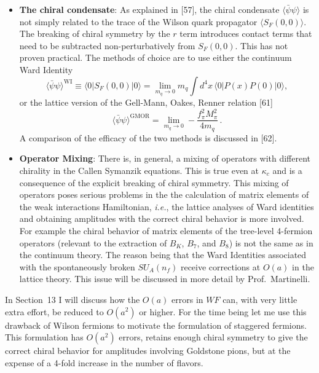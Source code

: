 \begin{itemize}
\item \textbf{The chiral condensate}: As explained in [57], the chiral
condensate $\langle \bar\psi \psi \rangle$ is not simply related to the trace
of the Wilson quark propagator $\langle S_F(0,0) \rangle$.  The breaking of
chiral symmetry by the $r$ term introduces contact terms that need to be
subtracted non-perturbatively from $S_F(0,0)$.  This has not proven practical.
The methods of choice are to use either the continuum Ward Identity
\begin{equation}
\langle \bar\psi\psi \rangle^{\mathrm{WI}} \equiv \langle 0| S_F(0,0) |0\rangle = \lim_{m_q \to 0} m_q \int d^4x\, \langle 0| P(x)P(0) |0\rangle,
\end{equation}
or the lattice version of the Gell-Mann, Oakes, Renner relation [61]
\begin{equation}
\langle \bar\psi\psi \rangle^{\mathrm{GMOR}} = \lim_{m_q \to 0} - \frac{f_\pi^2 M_\pi^2}{4 m_q} \,.
\end{equation}
A comparison of the efficacy of the two methods is discussed in [62].

\item \textbf{Operator Mixing}: There is, in general, a mixing of operators
with different chirality in the Callen Symanzik equations.  This is true even
at $\kappa_c$ and is a consequence of the explicit breaking of chiral symmetry.
This mixing of operators poses serious problems in the the calculation of
matrix elements of the weak interactions Hamiltonian, \textit{i.e.}, the
lattice analyses of Ward identities and obtaining amplitudes with the correct
chiral behavior is more involved.  For example the chiral behavior of matrix
elements of the tree-level 4-fermion operators (relevant to the extraction of
$B_K$, $B_7$, and $B_8$) is not the same as in the continuum theory.  The
reason being that the Ward Identities associated with the spontaneously broken
$SU_A(n_f)$ receive corrections at $O(a)$ in the lattice theory.  This issue
will be discussed in more detail by Prof.~Martinelli.
\end{itemize}

In Section~13 I will discuss how the $O(a)$ errors in $WF$ can, with very
little extra effort, be reduced to $O(a^2)$ or higher.  For the time being let
me use this drawback of Wilson fermions to motivate the formulation of
staggered fermions.  This formulation has $O(a^2)$ errors, retains enough
chiral symmetry to give the correct chiral behavior for amplitudes involving
Goldstone pions, but at the expense of a 4-fold increase in the number of
flavors.
